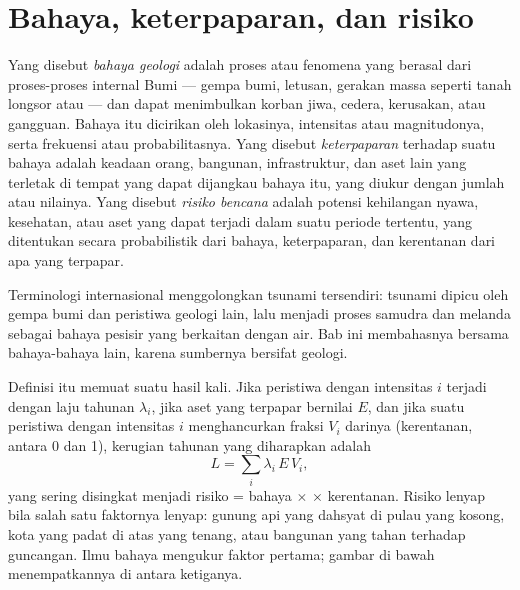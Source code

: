 \section{Bahaya, keterpaparan, dan risiko}\label{sec:b2:geological-hazards:risk}

\begin{definition}\label{def:b2:geological-hazards:risk}
Yang disebut \emph{bahaya geologi} adalah proses atau fenomena yang berasal dari
proses-proses internal Bumi --- gempa bumi, letusan, gerakan massa seperti
tanah longsor atau  --- dan dapat menimbulkan korban jiwa, cedera, kerusakan, atau gangguan. Bahaya itu
dicirikan oleh lokasinya, intensitas atau magnitudonya, serta frekuensi atau probabilitasnya. Yang disebut
\emph{keterpaparan} terhadap suatu bahaya adalah keadaan orang,
bangunan, infrastruktur, dan aset lain yang terletak di tempat yang dapat dijangkau bahaya itu, yang diukur dengan
jumlah atau nilainya. Yang disebut \emph{risiko bencana} adalah potensi kehilangan nyawa,
kesehatan, atau aset yang dapat terjadi dalam suatu periode tertentu, yang ditentukan secara probabilistik dari
bahaya, keterpaparan, dan kerentanan dari apa yang terpapar.
\end{definition}

Terminologi internasional menggolongkan tsunami tersendiri: tsunami dipicu oleh gempa bumi dan peristiwa
geologi lain, lalu menjadi proses samudra dan melanda sebagai bahaya pesisir yang berkaitan dengan air.
Bab ini membahasnya bersama bahaya-bahaya lain, karena sumbernya bersifat geologi.

Definisi itu memuat suatu hasil kali. Jika peristiwa dengan intensitas $i$ terjadi dengan laju tahunan
$\lambda_i$, jika aset yang terpapar bernilai $E$, dan jika suatu peristiwa dengan intensitas $i$ menghancurkan
fraksi $V_i$ darinya (kerentanan, antara 0 dan 1), kerugian tahunan yang diharapkan adalah
\begin{equation}
L = \sum_i \lambda_i \, E \, V_i ,
\label{eq:b2:geological-hazards:loss}
\end{equation}
yang sering disingkat menjadi risiko = bahaya $\times$  $\times$ kerentanan. Risiko lenyap bila
salah satu faktornya lenyap: gunung api yang dahsyat di pulau yang kosong, kota yang padat di atas  yang tenang, atau
bangunan yang tahan terhadap guncangan. Ilmu bahaya mengukur faktor pertama; gambar di bawah
menempatkannya di antara ketiganya.

